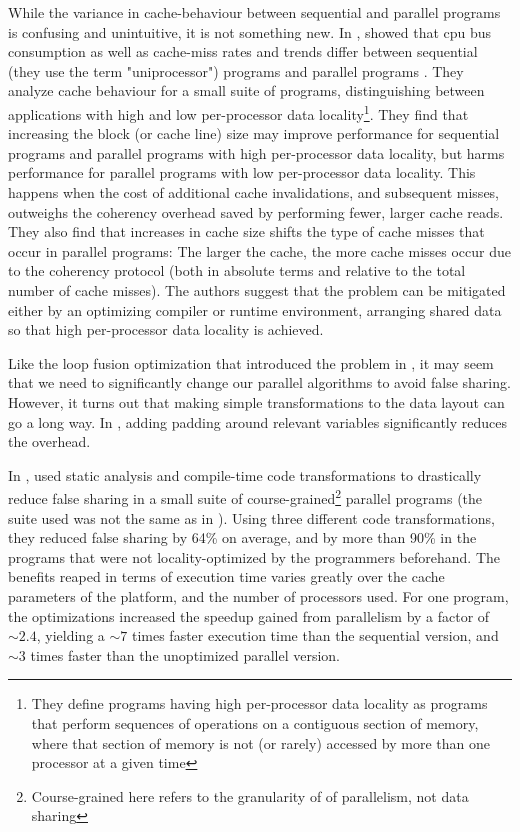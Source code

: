 While the variance in cache-behaviour between sequential and parallel programs
is confusing and unintuitive, it is not something new. In \citeyear{Eggersbus},
\citeauthor{Eggersbus} showed that cpu bus consumption as well as cache-miss
rates and trends differ between sequential (they use the term "uniprocessor")
programs and parallel programs \cite{Eggersbus}.
They analyze cache behaviour for a small suite of programs, distinguishing
between applications with high and low per-processor data locality\footnote{They
define programs having high per-processor data locality as programs that perform
sequences of operations on a contiguous section of memory, where that section of
memory is not (or rarely) accessed by more than one processor at a given time}.
They find that increasing the block (or cache line) size may improve
performance for sequential programs and parallel programs with high
per-processor data locality, but harms performance for parallel programs with
low per-processor data locality. This happens when the cost of additional cache
invalidations, and subsequent misses, outweighs the coherency overhead saved by
performing fewer, larger cache reads. They also find that increases in cache
size shifts the type of cache misses that occur in parallel programs: The larger
the cache, the more cache misses occur due to the coherency protocol (both in
absolute terms and relative to the total number of cache misses). The authors
suggest that the problem can be mitigated either by an optimizing compiler or
runtime environment, arranging shared data so that high per-processor data
locality is achieved.

Like the loop fusion optimization that introduced the problem in \cite{mystery},
it may seem that we need to significantly change our parallel algorithms to
avoid false sharing. However, it turns out that making simple transformations to
the data layout can go a long way. In \cite{mystery}, adding padding around
relevant variables significantly reduces the overhead.

In \citeyear{EggersReducing}, \citeauthor{EggersReducing} used static analysis
and compile-time code transformations to drastically reduce false sharing in a
small suite of course-grained\footnote{Course-grained here refers to the
granularity of of parallelism, not data sharing} parallel programs
\cite{EggersReducing} (the suite used was not the same as in \cite{Eggersbus}).
Using three different code transformations, they reduced false sharing by 64\%
on average, and by more than 90\% in the programs that were not
locality-optimized by the programmers beforehand. The benefits reaped in terms
of execution time varies greatly over the cache parameters of the platform, and
the number of processors used. For one program, the optimizations increased the
speedup gained from parallelism by a factor of $\sim 2.4$, yielding a $\sim 7$
times faster execution time than the sequential version, and $\sim 3$ times
faster than the unoptimized parallel version.

